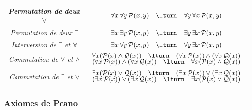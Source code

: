 \documentclass[11pt,class=report,crop=false]{standalone}
\begin{document}
\begin{center}
\begin{tabular}{|c|c|}
        \emph{Permutation de deux $\forall$}
        &
        $\forall x\,\forall y\,\mathcal P(x,y)
        \quad \lturn \quad
        \forall y\,\forall x\,\mathcal P(x,y)$
        \\ \hline

        \emph{Permutation de deux $\exists$}
        &
        $\exists x\,\exists y\,\mathcal P(x,y)
        \quad \lturn \quad
        \exists y\,\exists x\,\mathcal P(x,y)$
        \\ \hline

        \emph{Interversion de $\exists$ et $\forall$}
        &
        $\exists x\,\forall y\,\mathcal P(x,y)
        \quad \lturn \quad
        \forall y\,\exists x\,\mathcal P(x,y)$
        \\ \hline

        \emph{Commutation de $\forall$ et $\land$}
        &
        $\begin{array}{c}
        \forall x(\mathcal P(x)\land\mathcal Q(x))
        \quad \lturn \quad
        (\forall x\,\mathcal P(x))
        \land
        (\forall x\,\mathcal Q(x))
        \\[-0.3em]
        (\forall x\,\mathcal P(x))
        \land
        (\forall x\,\mathcal Q(x))
        \quad \lturn \quad
        \forall x(\mathcal P(x)\land\mathcal Q(x))
        \end{array}$
        \\ \hline

        \emph{Commutation de $\exists$ et $\lor$}
        &
        $\begin{array}{c}
        \exists x(\mathcal P(x)\lor\mathcal Q(x))
        \quad \lturn \quad
        (\exists x\,\mathcal P(x))
        \lor
        (\exists x\,\mathcal Q(x))
        \\[-0.3em]
        (\exists x\,\mathcal P(x))
        \lor
        (\exists x\,\mathcal Q(x))
        \quad \lturn \quad
        \exists x(\mathcal P(x)\lor\mathcal Q(x))
        \end{array}$
        \\ \hline

    \end{tabular}
\end{center}


\subsubsection{Axiomes de Peano}
\end{document}
